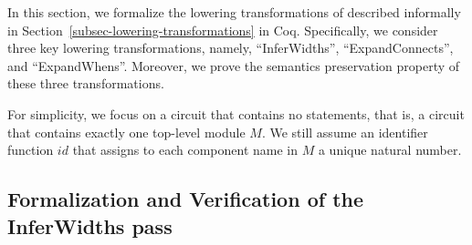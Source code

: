 
In this section, we formalize the lowering transformations of {\hifirrtl} described informally in Section~\ref{subsec-lowering-transformations} in Coq. Specifically, we consider three key lowering transformations, namely, %
``InferWidths'', %
``ExpandConnects'', and ``ExpandWhens''. %
Moreover, we prove the semantics preservation property of these three transformations. 

For simplicity, we focus on a {\hifirrtl} circuit that contains no  statements, that is, a circuit that contains exactly one top-level module $M$. We still assume an identifier function $id$ that assigns to each component name in $M$ a unique natural number. 


\subsection{Formalization and Verification of the InferWidths pass}





%
%


